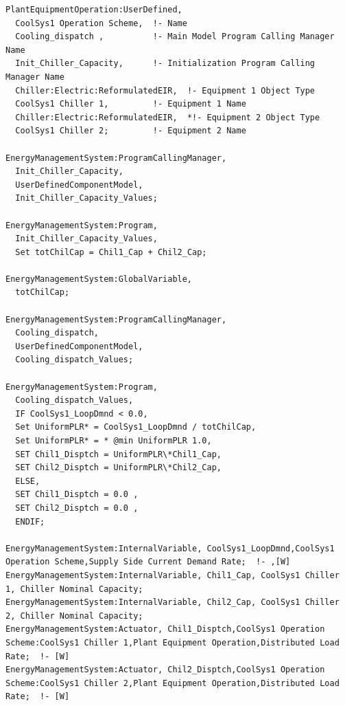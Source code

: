 \begin{lstlisting}
PlantEquipmentOperation:UserDefined,
  CoolSys1 Operation Scheme,  !- Name
  Cooling_dispatch ,          !- Main Model Program Calling Manager Name
  Init_Chiller_Capacity,      !- Initialization Program Calling Manager Name
  Chiller:Electric:ReformulatedEIR,  !- Equipment 1 Object Type
  CoolSys1 Chiller 1,         !- Equipment 1 Name
  Chiller:Electric:ReformulatedEIR,  *!- Equipment 2 Object Type
  CoolSys1 Chiller 2;         !- Equipment 2 Name

EnergyManagementSystem:ProgramCallingManager,
  Init_Chiller_Capacity,
  UserDefinedComponentModel,
  Init_Chiller_Capacity_Values;

EnergyManagementSystem:Program,
  Init_Chiller_Capacity_Values,
  Set totChilCap = Chil1_Cap + Chil2_Cap;

EnergyManagementSystem:GlobalVariable,
  totChilCap;

EnergyManagementSystem:ProgramCallingManager,
  Cooling_dispatch,
  UserDefinedComponentModel,
  Cooling_dispatch_Values;

EnergyManagementSystem:Program,
  Cooling_dispatch_Values,
  IF CoolSys1_LoopDmnd < 0.0,
  Set UniformPLR* = CoolSys1_LoopDmnd / totChilCap,
  Set UniformPLR* = * @min UniformPLR 1.0,
  SET Chil1_Disptch = UniformPLR\*Chil1_Cap,
  SET Chil2_Disptch = UniformPLR\*Chil2_Cap,
  ELSE,
  SET Chil1_Disptch = 0.0 ,
  SET Chil2_Disptch = 0.0 ,
  ENDIF;

EnergyManagementSystem:InternalVariable, CoolSys1_LoopDmnd,CoolSys1 Operation Scheme,Supply Side Current Demand Rate;  !- ,[W]
EnergyManagementSystem:InternalVariable, Chil1_Cap, CoolSys1 Chiller 1, Chiller Nominal Capacity;
EnergyManagementSystem:InternalVariable, Chil2_Cap, CoolSys1 Chiller 2, Chiller Nominal Capacity;
EnergyManagementSystem:Actuator, Chil1_Disptch,CoolSys1 Operation Scheme:CoolSys1 Chiller 1,Plant Equipment Operation,Distributed Load Rate;  !- [W]
EnergyManagementSystem:Actuator, Chil2_Disptch,CoolSys1 Operation Scheme:CoolSys1 Chiller 2,Plant Equipment Operation,Distributed Load Rate;  !- [W]
\end{lstlisting}